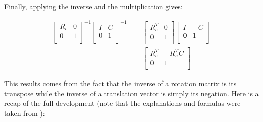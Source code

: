 Finally, applying the inverse and the multiplication gives:

\begin{align}
\left[
  \begin{array}{c|c}
    R_c & 0 \\
    \hline
    0 & 1 \\
  \end{array}
\right]^{-1} 
\left[
  \begin{array}{c|c}
    I & C \\
    \hline
    0 & 1 \\
  \end{array}
\right]^{-1} 
&= 
\left[
\begin{array}{c|c}
R_c^T & 0 \\
\hline
\boldsymbol{0} & 1 \\
\end{array}
\right]
\left[
\begin{array}{c|c}
I & -C \\
\hline
\boldsymbol{0} & 1 \\
\end{array}
\right] \\
&= 
\left[
\begin{array}{c|c}
R_c^T & -R_c^TC \\
\hline
\boldsymbol{0} & 1 \\
\end{array}
\right] 
\end{align} 

This results comes from the fact that the inverse of a rotation matrix is its transpose while the inverse of a translation vector is simply its negation. Here is a recap of the full development (note that the explanations and formulas were taken from \cite{dissecting}): 

